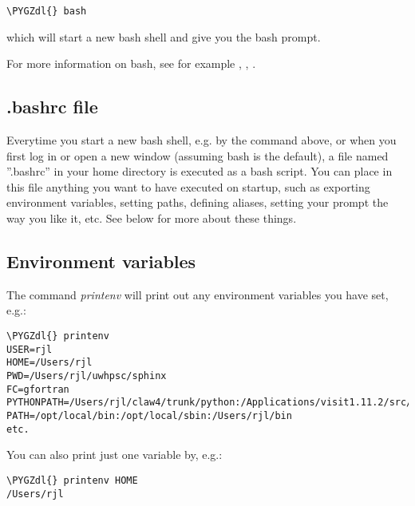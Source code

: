 \documentclass[letterpaper,10pt,english]{sphinxmanual}
\def\PYGZdl{\char`\$}
\begin{document}
\begin{Verbatim}[commandchars=\\\{\}]
\PYGZdl{} bash
\end{Verbatim}

which will start a new bash shell and give you the bash prompt.

For more information on bash, see for example
\label{unix:id3}{\hyperref[biblio:bash\string-beginners\string-guide]{}}, \label{unix:id4}{\hyperref[biblio:gnu\string-bash]{}}, \label{unix:id5}{\hyperref[biblio:wikipedia\string-bash]{}}.


\subsection{.bashrc file}
\label{unix:bashrc}\label{unix:bashrc-file}
Everytime you start a new bash shell, e.g. by the command above, or when you
first log in or open a new window (assuming bash is the default), a file
named ''.bashrc'' in your home directory is executed as a bash script.  You
can place in this file anything you want to have executed on startup, such
as exporting environment variables, setting paths, defining aliases, setting
your prompt the way you like it, etc.  See below for more about these
things.


\subsection{Environment variables}
\label{unix:environment-variables}\label{unix:env}
The command \emph{printenv} will print out any environment variables you have
set, e.g.:

\begin{Verbatim}[commandchars=\\\{\}]
\PYGZdl{} printenv
USER=rjl
HOME=/Users/rjl
PWD=/Users/rjl/uwhpsc/sphinx
FC=gfortran
PYTHONPATH=/Users/rjl/claw4/trunk/python:/Applications/visit1.11.2/src/lib:
PATH=/opt/local/bin:/opt/local/sbin:/Users/rjl/bin
etc.
\end{Verbatim}

You can also print just one variable by, e.g.:

\begin{Verbatim}[commandchars=\\\{\}]
\PYGZdl{} printenv HOME
/Users/rjl
\end{Verbatim}
\end{document}
